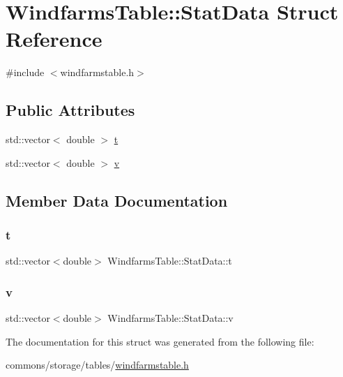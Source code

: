 \hypertarget{struct_windfarms_table_1_1_stat_data}{}\section{Windfarms\+Table\+::Stat\+Data Struct Reference}
\label{struct_windfarms_table_1_1_stat_data}


{\ttfamily \#include $<$windfarmstable.\+h$>$}

\subsection*{Public Attributes}
\begin{DoxyCompactItemize}
\item 
std\+::vector$<$ double $>$ \mbox{\hyperlink{struct_windfarms_table_1_1_stat_data_ae4a82398fb4809af2f0c69167e48dd55}{t}}
\item 
std\+::vector$<$ double $>$ \mbox{\hyperlink{struct_windfarms_table_1_1_stat_data_aece9890fab227a7dcddd7484d3592b16}{v}}
\end{DoxyCompactItemize}


\subsection{Member Data Documentation}
\mbox{\label{struct_windfarms_table_1_1_stat_data_ae4a82398fb4809af2f0c69167e48dd55}} 
\subsubsection{\texorpdfstring{t}{t}}
{\footnotesize\ttfamily std\+::vector$<$double$>$ Windfarms\+Table\+::\+Stat\+Data\+::t}

\mbox{\label{struct_windfarms_table_1_1_stat_data_aece9890fab227a7dcddd7484d3592b16}} 
\subsubsection{\texorpdfstring{v}{v}}
{\footnotesize\ttfamily std\+::vector$<$double$>$ Windfarms\+Table\+::\+Stat\+Data\+::v}



The documentation for this struct was generated from the following file\+:\begin{DoxyCompactItemize}
\item 
commons/storage/tables/\mbox{\hyperlink{windfarmstable_8h}{windfarmstable.\+h}}\end{DoxyCompactItemize}
